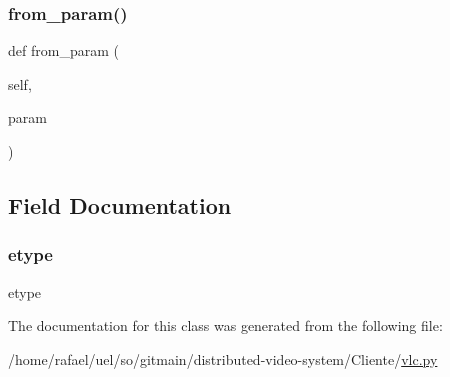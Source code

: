\subsubsection{\texorpdfstring{from\+\_\+param()}{from\_param()}}
{\footnotesize\ttfamily def from\+\_\+param (\begin{DoxyParamCaption}\item[{}]{self,  }\item[{}]{param }\end{DoxyParamCaption})}



\subsection{Field Documentation}
\mbox{\label{classvlc_1_1_list_p_o_i_n_t_e_r_ac771a20ee94453196998b6165dda15b3}} 
\subsubsection{\texorpdfstring{etype}{etype}}
{\footnotesize\ttfamily etype}



The documentation for this class was generated from the following file\+:\begin{DoxyCompactItemize}
\item 
/home/rafael/uel/so/gitmain/distributed-\/video-\/system/\+Cliente/\hyperlink{vlc_8py}{vlc.\+py}\end{DoxyCompactItemize}
